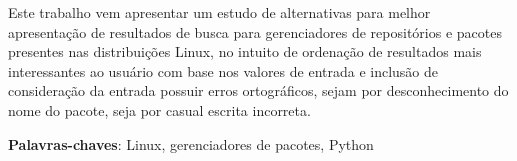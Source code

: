 \begin{resumo}

Este trabalho vem apresentar um estudo de alternativas para melhor apresentação de resultados de busca para gerenciadores de repositórios e pacotes presentes nas distribuições Linux, no intuito de ordenação de resultados mais interessantes ao usuário com base nos valores de entrada e inclusão de consideração da entrada possuir erros ortográficos, sejam por desconhecimento do nome do pacote, seja por casual escrita incorreta.

 \vspace{\onelineskip}
    
 \noindent
 \textbf{Palavras-chaves}: Linux, gerenciadores de pacotes, Python
\end{resumo}
